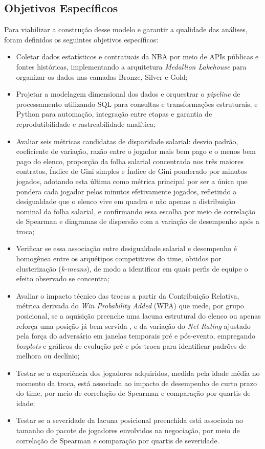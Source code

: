 \subsection{Objetivos Específicos}
\label{sec:specific_objectives}
Para viabilizar a construção desse modelo e garantir a qualidade das análises, foram definidos os seguintes objetivos específicos:
\begin{itemize}
    \item Coletar dados estatísticos e contratuais da NBA por meio de APIs públicas e fontes históricas, implementando a arquitetura \textit{Medallion Lakehouse} para organizar os dados nas camadas Bronze, Silver e Gold;
    \item Projetar a modelagem dimensional dos dados e orquestrar o \textit{pipeline} de processamento utilizando SQL para consultas e transformações estruturais, e Python para automação, integração entre etapas e garantia de reprodutibilidade e rastreabilidade analítica;
    \item Avaliar seis métricas candidatas de disparidade salarial: desvio padrão, coeficiente de variação, razão entre o jogador mais bem pago e o menos bem pago do elenco, proporção da folha salarial concentrada nos três maiores contratos, Índice de Gini simples e Índice de Gini ponderado por minutos jogados, adotando esta última como métrica principal por ser a única que pondera cada jogador pelos minutos efetivamente jogados, refletindo a desigualdade que o elenco vive em quadra e não apenas a distribuição nominal da folha salarial, e confirmando essa escolha por meio de correlação de Spearman e diagramas de dispersão com a variação de desempenho após a troca;
    \item Verificar se essa associação entre desigualdade salarial e desempenho é homogênea entre os arquétipos competitivos do time, obtidos por clusterização (\textit{k-means}), de modo a identificar em quais perfis de equipe o efeito observado se concentra;
    \item Avaliar o impacto técnico das trocas a partir da Contribuição Relativa, métrica derivada do \textit{Win Probability Added} (WPA) que mede, por grupo posicional, se a aquisição preenche uma lacuna estrutural do elenco ou apenas reforça uma posição já bem servida \citep{sa2025}, e da variação do \textit{Net Rating} ajustado pela força do adversário em janelas temporais pré e pós-evento, empregando \textit{boxplots} e gráficos de evolução pré e pós-troca para identificar padrões de melhora ou declínio;
    \item Testar se a experiência dos jogadores adquiridos, medida pela idade média no momento da troca, está associada ao impacto de desempenho de curto prazo do time, por meio de correlação de Spearman e comparação por quartis de idade;
    \item Testar se a severidade da lacuna posicional preenchida está associada ao tamanho do pacote de jogadores envolvidos na negociação, por meio de correlação de Spearman e comparação por quartis de severidade.
\end{itemize}

